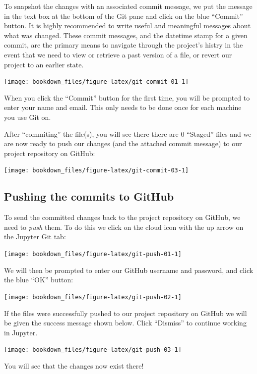 \documentclass[
]{krantz}
\renewenvironment{quote}{\begin{VF}}{\end{VF}}
\begin{document}
To snapshot the changes with an associated commit message, we put the message in the text box
at the bottom of the Git pane and click on the blue ``Commit'' button.
It is highly recommended to write useful and meaningful messages about what
was changed. These commit messages, and the datetime stamp for a given
commit, are the primary means to navigate through the project's histry in the
event that we need to view or retrieve a past version of a file, or
revert our project to an earlier state.

\texttt{[image: bookdown\_files/figure-latex/git-commit-01-1]}

\begin{quote}
When you click the ``Commit'' button for the first time, you will be prompted to
enter your name and email. This only needs to be done once for each machine
you use Git on.
\end{quote}

After ``commiting'' the file(s), you will see there there are 0 ``Staged'' files and we
are now ready to push our changes (and the attached commit message) to our
project repository on GitHub:

\texttt{[image: bookdown\_files/figure-latex/git-commit-03-1]}

\hypertarget{pushing-the-commits-to-github}{%
\subsection{Pushing the commits to GitHub}\label{pushing-the-commits-to-github}}

To send the committed changes back to the project repository on
GitHub, we need to \emph{push} them. To do this we click on
the cloud icon with the up arrow on the Jupyter Git tab:

\texttt{[image: bookdown\_files/figure-latex/git-push-01-1]}

We will then be prompted to enter our GitHub username
and password, and click the blue ``OK'' button:

\texttt{[image: bookdown\_files/figure-latex/git-push-02-1]}

If the files were successfully pushed to our project repository on
GitHub we will be given the success message shown
below. Click ``Dismiss'' to continue working in Jupyter.

\texttt{[image: bookdown\_files/figure-latex/git-push-03-1]}

You will see that the changes now exist there!
\end{document}
